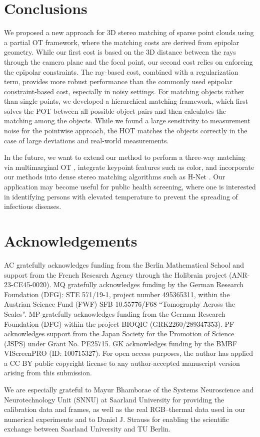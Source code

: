 \documentclass[10pt, twocolumn]{article}
\theoremstyle{definition}
\begin{document}
\section{Conclusions} \label{sec:conclusions}

We proposed a new approach for 3D stereo matching of sparse point clouds using a partial OT framework, 
where the matching costs are derived from epipolar geometry. 
While our first cost is based on the 3D distance between the rays through the camera plane and the focal point, 
our second cost relies on enforcing the epipolar constraints.
The ray-based cost, combined with a regularization term, provides more robust performance than the commonly used epipolar constraint-based cost, especially in noisy settings.
For matching objects rather than single points, we developed a hierarchical matching framework, which first solves the POT between all possible object pairs and then calculates the matching among the objects. 
While we found a large sensitivity to measurement noise for the pointwise approach, the HOT matches the objects correctly in the case of large deviations and real-world measurements.
   
In the future, we want to extend our method to perform a three-way matching via multimarginal OT \cite{Ba2022,Lin2020,Pass2014},
integrate keypoint features such as color, and
incorporate our methods into dense stereo matching algorithms such as H-Net \cite{huang2022h}. 
Our application may become useful for public health screening, where one is interested in identifying persons with elevated temperature to prevent the spreading of infectious diseases.

\section*{Acknowledgements}
{AC gratefully acknowledges funding from the Berlin Mathematical School and support from the French Research Agency through the Holibrain project (ANR-23-CE45-0020).}
MQ gratefully acknowledges funding by the German Research Foundation (DFG): STE 571/19-1, project number 495365311, within the Austrian Science Fund (FWF) SFB 10.55776/F68 “Tomography Across the Scales”. 
MP gratefully acknowledges funding from the German Research Foundation (DFG) within the project BIOQIC
(GRK2260/289347353).
{PF acknowledges support from the Japan Society for the Promotion of Science (JSPS) under Grant No. PE25715.}
GK acknowledges funding by the BMBF VI\-ScreenPRO (ID: 100715327).
For open access purposes, the author has applied a CC BY public copyright license to any author-accepted manuscript version arising from this submission.

We are especially grateful to Mayur Bhamborae of the Systems Neuroscience and Neurotechnology Unit (SNNU) at Saarland University for providing the calibration data and frames, as well as the real RGB–thermal data used in our numerical experiments {and to Daniel J. Strauss for enabling the scientific exchange between Saarland University and TU Berlin.}


\newpage

\appendix
\end{document}
